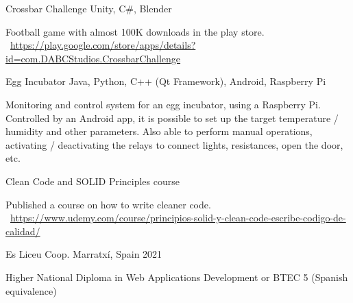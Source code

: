 \documentclass[]{awesome-cv}
\begin{document}
\begin{cventries}
	\vspace{-3mm}
	\cventry
	{}
	{Crossbar Challenge \vspace{-5mm}}
	{Unity, C\#, Blender \vspace{-5mm}}
	{}
	{\begin{cvsectionnormaltext}
		\item {Football game with almost 100K downloads in the play store. 
		\newline \faLink\ \href{https://play.google.com/store/apps/details?id=com.DABCStudios.CrossbarChallenge}{https://play.google.com/store/apps/details?id=com.DABCStudios.CrossbarChallenge}}
	\end{cvsectionnormaltext}}

	\vspace{-3mm}
	\cventry
	{}
	{Egg Incubator \vspace{-5mm}}
	{Java, Python, C++ (Qt Framework), Android, Raspberry Pi \vspace{-5mm}}
	{}
	{\begin{cvsectionnormaltext}
		\item{Monitoring and control system for an egg incubator, using a Raspberry Pi. Controlled by an Android app, it is possible to set up the target temperature / humidity and other parameters. Also able to perform manual operations, activating / deactivating the relays to connect lights, resistances, open the door, etc.}
	\end{cvsectionnormaltext}}	
	
	\vspace{-3mm}
	\cventry
	{}
	{Clean Code and SOLID Principles course \vspace{-5mm}}
	{}
	{}
	{\begin{cvsectionnormaltext}
		\item{Published a course on how to write cleaner code.
		\newline \faLink\ \href{https://www.udemy.com/course/principios-solid-y-clean-code-escribe-codigo-de-calidad/}{https://www.udemy.com/course/principios-solid-y-clean-code-escribe-codigo-de-calidad/}}
	\end{cvsectionnormaltext}}
	
	\vspace{-5mm}
	
\end{cventries}

\vspace{8mm}
\begin{cventries}
	\vspace{-3mm}
	\cventry
	{}
	{Es Liceu Coop. \vspace{-5mm}}
	{Marratxí, Spain \vspace{-5mm}}
	{2021 \vspace{-5mm}}
	{\begin{cvsectionnormaltext} 
		\item{Higher National Diploma in Web Applications Development or BTEC 5 (Spanish equivalence)}
	\end{cvsectionnormaltext}}
\end{cventries}
\end{document}
